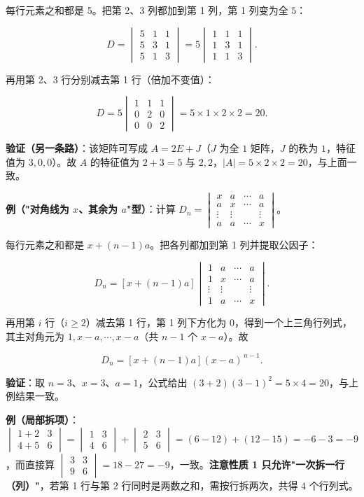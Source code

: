 \documentclass[11pt,openany,UTF8]{ctexbook}
\begin{document}
每行元素之和都是 $5$。把第 2、3 列都加到第 1 列，第 1 列变为全 $5$：

\[D=\begin{vmatrix}5&1&1\\5&3&1\\5&1&3\end{vmatrix}=5\begin{vmatrix}1&1&1\\1&3&1\\1&1&3\end{vmatrix}.\]

再用第 2、3 行分别减去第 1 行（倍加不变值）：

\[D=5\begin{vmatrix}1&1&1\\0&2&0\\0&0&2\end{vmatrix}=5\times1\times2\times2=20 .\]

\textbf{验证（另一条路）}：该矩阵可写成 $A=2E+J$（$J$ 为全 $1$ 矩阵，$J$ 的秩为 $1$，特征值为 $3,0,0$）。故 $A$ 的特征值为 $2+3=5$ 与 $2,2$，$\vert A\vert=5\times2\times2=20$，与上面一致。

\textbf{例（"对角线为 $x$、其余为 $a$"型）}：计算 $D_n=\begin{vmatrix}x&a&\cdots&a\\a&x&\cdots&a\\\vdots&\vdots&&\vdots\\a&a&\cdots&x\end{vmatrix}$。

每行元素之和都是 $x+(n-1)a$。把各列都加到第 1 列并提取公因子：

\[D_n=\left[x+(n-1)a\right]\begin{vmatrix}1&a&\cdots&a\\1&x&\cdots&a\\\vdots&\vdots&&\vdots\\1&a&\cdots&x\end{vmatrix}.\]

再用第 $i$ 行（$i\ge2$）减去第 1 行，第 1 列下方化为 $0$，得到一个上三角行列式，其主对角元为 $1,x-a,\cdots,x-a$（共 $n-1$ 个 $x-a$）。故

\[D_n=\left[x+(n-1)a\right](x-a)^{\,n-1}.\]

\textbf{验证}：取 $n=3$、$x=3$、$a=1$，公式给出 $(3+2)(3-1)^2=5\times4=20$，与上例结果一致。

\textbf{例（局部拆项）}：$\begin{vmatrix}1+2&3\\4+5&6\end{vmatrix}=\begin{vmatrix}1&3\\4&6\end{vmatrix}+\begin{vmatrix}2&3\\5&6\end{vmatrix}=(6-12)+(12-15)=-6-3=-9$，而直接算 $\begin{vmatrix}3&3\\9&6\end{vmatrix}=18-27=-9$，一致。\textbf{注意性质 1 只允许"一次拆一行（列）"}，若第 1 行与第 2 行同时是两数之和，需按行拆两次，共得 $4$ 个行列式。
\end{document}
